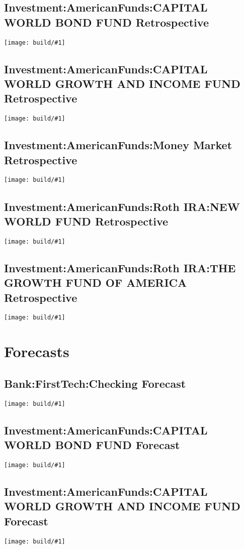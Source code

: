 \documentclass[pdftex,12pt,letterpaper]{report}
\newcommand{\insertplot}[1]{\texttt{[image: build/\#1]}\\[1cm]}
\begin{document}
\subsection{Investment:AmericanFunds:CAPITAL WORLD BOND FUND Retrospective}
\insertplot{Assets:Investment:AmericanFunds:CAPITALWORLDBONDFUNDretro}
\subsection{Investment:AmericanFunds:CAPITAL WORLD GROWTH AND INCOME FUND Retrospective}
\insertplot{Assets:Investment:AmericanFunds:CAPITALWORLDGROWTHANDINCOMEFUNDretro}
\subsection{Investment:AmericanFunds:Money Market Retrospective}
\insertplot{Assets:Investment:AmericanFunds:MoneyMarketretro}
\subsection{Investment:AmericanFunds:Roth IRA:NEW WORLD FUND Retrospective}
\insertplot{Assets:Investment:AmericanFunds:RothIRA:NEWWORLDFUNDretro}
\subsection{Investment:AmericanFunds:Roth IRA:THE GROWTH FUND OF AMERICA Retrospective}
\insertplot{Assets:Investment:AmericanFunds:RothIRA:THEGROWTHFUNDOFAMERICAretro}
\section{Forecasts}
\subsection{Bank:FirstTech:Checking Forecast}
\insertplot{Assets:Bank:FirstTech:Checkingforecast}
\subsection{Investment:AmericanFunds:CAPITAL WORLD BOND FUND Forecast}
\insertplot{Assets:Investment:AmericanFunds:CAPITALWORLDBONDFUNDforecast}
\subsection{Investment:AmericanFunds:CAPITAL WORLD GROWTH AND INCOME FUND Forecast}
\insertplot{Assets:Investment:AmericanFunds:CAPITALWORLDGROWTHANDINCOMEFUNDforecast}
\end{document}
